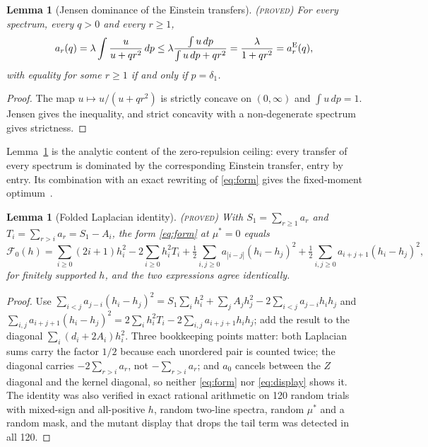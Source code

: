 \documentclass[11pt]{article}
\newcommand{\Fcal}{\mathcal F}
\newcommand{\muS}{\mu^{*}}
\newtheorem{lemma}[theorem]{Lemma}
\theoremstyle{definition}
\theoremstyle{remark}
\newcommand{\proved}{\textnormal{\textsc{(proved)}}}
\begin{document}
\begin{lemma}[Jensen dominance of the Einstein transfers]\label{lem:jensen}\proved
For every spectrum, every $q>0$ and every $r\ge1$,
\begin{equation}\label{eq:jensen}
a_r(q)=\lambda\int\frac{u}{u+qr^2}\,dp
\le\lambda\frac{\int u\,dp}{\int u\,dp+qr^2}=\frac{\lambda}{1+qr^2}=a_r^{\rm E}(q),
\end{equation}
with equality for some $r\ge1$ if and only if $p=\delta_1$.
\end{lemma}
\begin{proof}
The map $u\mapsto u/(u+qr^2)$ is strictly concave on $(0,\infty)$ and $\int u\,dp=1$.
Jensen gives the inequality, and strict concavity with a non-degenerate spectrum gives
strictness.
\end{proof}

Lemma~\ref{lem:jensen} is the analytic content of the zero-repulsion ceiling: every
transfer of every spectrum is dominated by the corresponding Einstein transfer, entry by
entry. Its combination with an exact rewriting of \eqref{eq:form} gives the fixed-moment
optimum~\cite{rens}.

\begin{lemma}[Folded Laplacian identity]\label{lem:laplace}\proved
With $S_1=\sum_{r\ge1}a_r$ and $T_i=\sum_{r>i}a_r=S_1-A_i$, the form \eqref{eq:form} at
$\muS=0$ equals
\begin{equation}\label{eq:display}
\Fcal_0(h)=\sum_{i\ge0}(2i+1)h_i^2-2\sum_{i\ge0}h_i^2T_i
+\tfrac12\sum_{i,j\ge0}a_{|i-j|}(h_i-h_j)^2
+\tfrac12\sum_{i,j\ge0}a_{i+j+1}(h_i-h_j)^2 ,
\end{equation}
for finitely supported $h$, and the two expressions agree identically.
\end{lemma}
\begin{proof}
Use $\sum_{i<j}a_{j-i}(h_i-h_j)^2=S_1\sum_ih_i^2+\sum_jA_jh_j^2-2\sum_{i<j}a_{j-i}h_ih_j$
and $\sum_{i,j}a_{i+j+1}(h_i-h_j)^2=2\sum_ih_i^2T_i-2\sum_{i,j}a_{i+j+1}h_ih_j$; add the
result to the diagonal $\sum_i(d_i+2A_i)h_i^2$. Three bookkeeping points matter: both
Laplacian sums carry the factor $1/2$ because each unordered pair is counted twice; the
diagonal carries $-2\sum_{r>i}a_r$, not $-\sum_{r>i}a_r$; and $a_0$ cancels between the
$Z$ diagonal and the kernel diagonal, so neither \eqref{eq:form} nor \eqref{eq:display}
shows it. The identity was also verified in exact rational arithmetic on 120 random
trials with mixed-sign and all-positive $h$, random two-line spectra, random $\muS$ and a
random mask, and the mutant display that drops the tail term was detected in all 120.
\end{proof}
\end{document}
